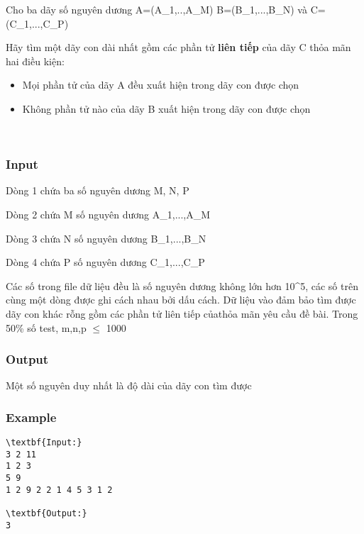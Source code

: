 

Cho ba dãy số nguyên dương A=(A\_1,..,A\_M) B=(B\_1,...,B\_N) và C=(C\_1,...,C\_P)

Hãy tìm một dãy con dài nhất gồm các phần tử \textbf{ liên tiếp } của dãy C thỏa mãn hai điều kiện:
\begin{itemize}
	\item Mọi phần tử của dãy A đều xuất hiện trong dãy con được chọn
	\item Không phần tử nào của dãy B xuất hiện trong dãy con được chọn
\end{itemize}

 

\subsubsection{Input}

Dòng 1 chứa ba số nguyên dương M, N, P

Dòng 2 chứa M số nguyên dương A\_1,...,A\_M

Dòng 3 chứa N số nguyên dương B\_1,...,B\_N

Dòng 4 chứa P số nguyên dương C\_1,...,C\_P

Các số trong file dữ liệu đều là số nguyên dương không lớn hơn 10^5, các số trên cùng một dòng được ghi cách nhau bởi dấu cách. Dữ liệu vào đảm bảo tìm được dãy con khác rỗng gồm các phần tử liên tiếp củathỏa mãn yêu cầu đề bài. Trong 50\% số test, m,n,p  $\le$  1000

\subsubsection{Output}

Một số nguyên duy nhất là độ dài của dãy con tìm được

\subsubsection{Example}
\begin{verbatim}
\textbf{Input:}
3 2 11
1 2 3
5 9
1 2 9 2 2 1 4 5 3 1 2

\textbf{Output:}
3\end{verbatim}
